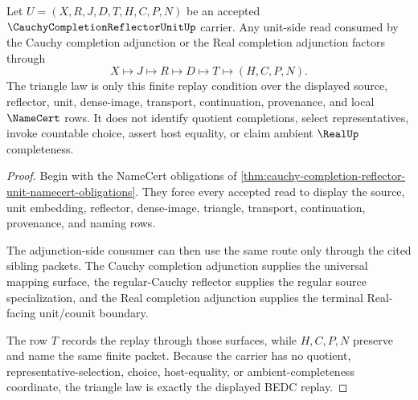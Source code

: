 \begin{theorem}
\label{thm:cauchy-completion-reflector-unit-triangle-law}
Let $U=(X,R,J,D,T,H,C,P,N)$ be an accepted $\CauchyCompletionReflectorUnitUp$ carrier. Any unit-side read consumed by the Cauchy completion adjunction or the Real completion adjunction factors through
$$
X\longmapsto J\longmapsto R\longmapsto D\longmapsto T\longmapsto(H,C,P,N).
$$
The triangle law is only this finite replay condition over the displayed source, reflector, unit, dense-image, transport, continuation, provenance, and local $\NameCert$ rows. It does not identify quotient completions, select representatives, invoke countable choice, assert host equality, or claim ambient $\RealUp$ completeness.
\end{theorem}
\begin{proof}
Begin with the NameCert obligations of \autoref{thm:cauchy-completion-reflector-unit-namecert-obligations}. They force every accepted read to display the source, unit embedding, reflector, dense-image, triangle, transport, continuation, provenance, and naming rows.

The adjunction-side consumer can then use the same route only through the cited sibling packets. The Cauchy completion adjunction supplies the universal mapping surface, the regular-Cauchy reflector supplies the regular source specialization, and the Real completion adjunction supplies the terminal Real-facing unit/counit boundary.

The row $T$ records the replay through those surfaces, while $H,C,P,N$ preserve and name the same finite packet. Because the carrier has no quotient, representative-selection, choice, host-equality, or ambient-completeness coordinate, the triangle law is exactly the displayed BEDC replay.
\end{proof}


\begin{closurestatus}{\CauchyCompletionReflectorUnitUp}
  \theoryclosure{\seedClosure}
  \formalstatus{\unformalizedV}
\end{closurestatus}
